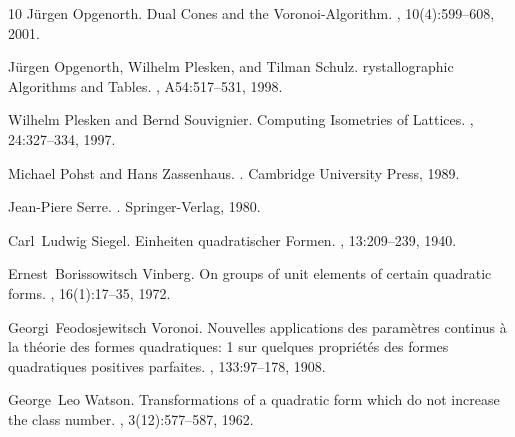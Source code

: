 \documentclass[10pt, preprint]{elsarticle}
\theoremstyle{definition}
\theoremstyle{definition}
\begin{document}
\begin{thebibliography}{10}
J\"urgen Opgenorth.
\newblock Dual {C}ones and the {V}oronoi-{A}lgorithm.
, 10(4):599--608, 2001.

J\"urgen Opgenorth, Wilhelm Plesken, and Tilman Schulz.
rystallographic {A}lgorithms and {T}ables.
, {A}54:517--531, 1998.

Wilhelm Plesken and Bernd Souvignier.
\newblock Computing {I}sometries of {L}attices.
, 24:327--334, 1997.

Michael Pohst and Hans Zassenhaus.
.
\newblock Cambridge University Press, 1989.

Jean-Piere Serre.
.
\newblock Springer-Verlag, 1980.

Carl~Ludwig Siegel.
\newblock Einheiten quadratischer {F}ormen.
, 13:209--239, 1940.

Ernest~Borissowitsch Vinberg.
\newblock On groups of unit elements of certain quadratic forms.
, 16(1):17--35, 1972.

Georgi~Feodosjewitsch Voronoi.
\newblock Nouvelles applications des param\`etres continus \`a la th\'eorie des
  formes quadratiques: 1 sur quelques propri\'et\'es des formes quadratiques
  positives parfaites.
, 133:97--178,
  1908.

George~Leo Watson.
\newblock Transformations of a quadratic form which do not increase the class
  number.
, 3(12):577--587,
  1962.

\end{thebibliography}
\end{document}
